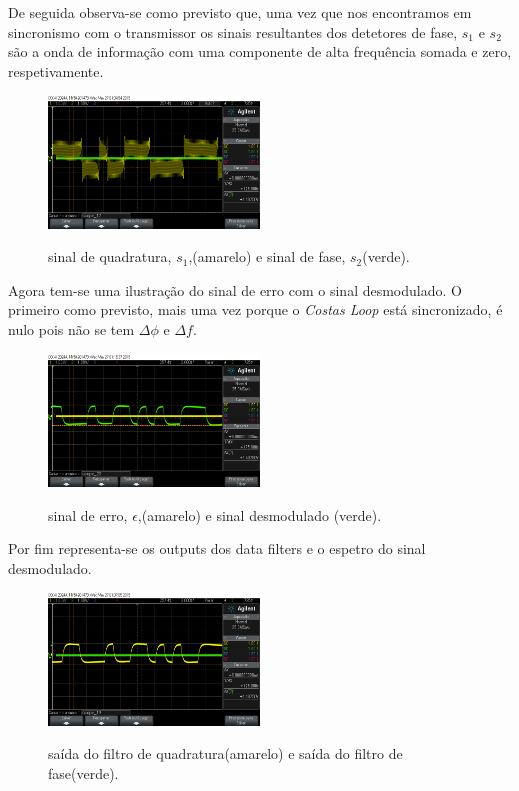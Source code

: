 \documentclass[11pt]{article}
\numberwithin{equation}{section}
\begin{document}
De seguida observa-se como previsto que, uma vez que nos encontramos em sincronismo com o transmissor os sinais resultantes dos detetores de fase, $s_1$ e $s_2$ são a onda de informação com uma componente de alta frequência somada e zero, respetivamente.

\begin{figure}[H]
	\centering
	\includegraphics[width=0.5\textwidth]{./s1_s2n}~\\
	\caption{sinal de quadratura, $s_1$,(amarelo) e sinal de fase, $s_2$(verde).}
	\label{s1_s2}
\end{figure}

Agora tem-se uma ilustração do sinal de erro com o sinal desmodulado. O primeiro como previsto, mais uma vez porque o \textit{Costas Loop} está sincronizado, é nulo pois não se tem $\Delta\phi$ e $\Delta f$.

\begin{figure}[H]
	\centering
	\includegraphics[width=0.5\textwidth]{./erro_y1n}~\\
	\caption{sinal de erro, $\epsilon$,(amarelo) e sinal desmodulado (verde).}
	\label{s1_s2}
\end{figure}

Por fim representa-se os outputs dos data filters e o espetro do sinal desmodulado.

\begin{figure}[H]
	\centering
	\includegraphics[width=0.5\textwidth]{./y1_y2n}~\\
	\caption{saída do filtro de quadratura(amarelo) e saída do filtro de fase(verde).}
	\label{espetro}
\end{figure}
\end{document}

